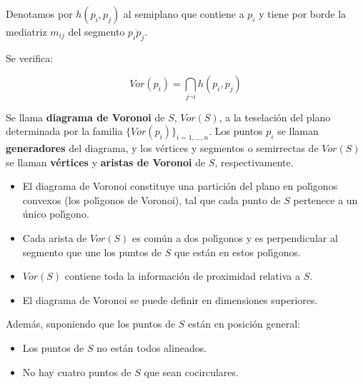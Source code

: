 \documentclass[twoside]{report}
\begin{document}
\vspace{-0.1cm}

Denotamos por $h(p_i,p_j)$ al semiplano que contiene a $p_i$ y
tiene por borde la mediatriz $m_{ij}$ del segmento
$\overline{p_ip_j}$.

\begin{lemma} Se verifica:

$$Vor(p_i)= \bigcap _{j\neg i} h(p_i,p_j)$$


\end{lemma}

\begin{defi} Se llama \textbf{diagrama de Voronoi} de $S$,
$Vor(S)$, a la teselaci\'{o}n del plano determinada por la familia
$\{Vor(p_i)\}_{i=1,\dots,n}$. Los puntos $p_i$ se llaman \textbf{generadores} del diagrama, y los v\'{e}rtices y segmentos o
semirrectas de $Vor(S)$ se llaman \textbf{v\'{e}rtices} y \textbf{aristas de Voronoi} de $S$, respectivamente.
\end{defi}

\begin{nota}
\begin{itemize}

  \item El diagrama de Voronoi constituye una partici\'{o}n del plano en pol\'{\i}gonos convexos (los pol\'{\i}gonos de Voronoi), tal que cada punto de $S$ pertenece a un \'{u}nico pol\'{\i}gono.

  \item Cada arista de $Vor(S)$ es com\'{u}n a dos pol\'{\i}gonos y es perpendicular al segmento que une los puntos de $S$ que est\'{a}n en estos pol\'{\i}gonos.

  \item $Vor(S)$ contiene toda la informaci\'{o}n de proximidad relativa a $S$.

  \item El diagrama de Voronoi se puede definir en dimensiones superiores.

\end{itemize}
\end{nota}

\vspace{0.3cm}
\noindent Además, suponiendo que los puntos de $S$ están en posici\'on general:

\begin{itemize}

  \item Los puntos de $S$ no est\'{a}n todos alineados.

  \item No hay cuatro puntos de $S$ que sean cocirculares.

\end{itemize}
\end{document}
